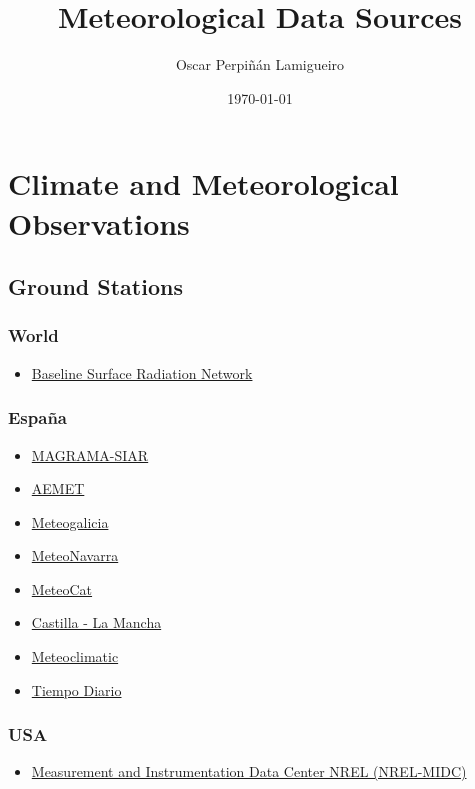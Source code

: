 \documentclass[11pt]{article}
\author{Oscar Perpiñán Lamigueiro}
\date{\today}
\title{Meteorological Data Sources}
\begin{document}
\maketitle
\tableofcontents


\section{Climate and Meteorological Observations}
\label{sec-1}

\subsection{Ground Stations}
\label{sec-1-1}
\subsubsection{World}
\label{sec-1-1-1}
\begin{itemize}
\item \href{http://www.bsrn.awi.de/}{Baseline Surface Radiation Network}
\end{itemize}
\subsubsection{España}
\label{sec-1-1-2}
\begin{itemize}
\item \href{http://eportal.magrama.gob.es/websiar/Inicio.aspx}{MAGRAMA-SIAR}
\item \href{http://www.aemet.es/es/eltiempo/observacion/ultimosdatos}{AEMET}
\item \href{http://www2.meteogalicia.es/galego/observacion/estacions/estacions.asp#}{Meteogalicia}
\item \href{http://meteo.navarra.es/estaciones/descargardatos.cfm}{MeteoNavarra}
\item \href{http://www.meteo.cat/xema/AppJava/SeleccioPerComarca.do}{MeteoCat}
\item \href{http://crea.uclm.es/siar/datmeteo/}{Castilla - La Mancha}
\item \href{http://www.meteoclimatic.com/}{Meteoclimatic}
\item \href{http://www.tiempodiario.com/}{Tiempo Diario}
\end{itemize}
\subsubsection{USA}
\label{sec-1-1-3}
\begin{itemize}
\item \href{http://www.nrel.gov/midc/}{Measurement and Instrumentation Data Center NREL (NREL-MIDC)}
\end{itemize}
\end{document}
